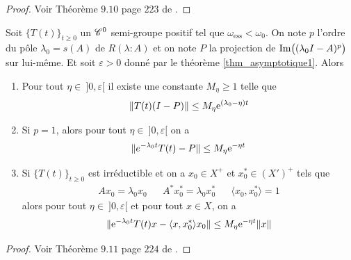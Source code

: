 \begin{proof}
    Voir Théorème $9.10$ page $223$ de \cite{Clement1987}.
\end{proof}

\begin{theorem}\label{thm_asymptotique2}
    Soit $\big\{T(t)\big\}_{t \geq 0}$ un $\mathscr{C}^0$ semi-groupe positif tel que $\omega_{\text{ess}} < \omega_0$. On note $p$ l'ordre du pôle $\lambda_0=s(A)$ de $R(\lambda : A)$ et on note $P$ la projection de $\mathrm{Im}\big((\lambda_0I-A)^p\big)$ sur lui-même. Et soit $\varepsilon >0$ donné par le théorème \ref{thm_asymptotique1}. Alors 
    \begin{enumerate}
        \item Pour tout $\eta \in \ ]0,\varepsilon[$ il existe une constante $M_\eta\geq 1$ telle que 
        \begin{equation*}
            \|T(t)(I-P)\| \leq M_\eta \mathrm{e}^{(\lambda_0-\eta)t}
        \end{equation*}
        \item Si $p=1$, alors pour tout $\eta \in \ ]0,\varepsilon[$ on a 
        \begin{equation*}
            \|e^{-\lambda_0t}T(t)-P\| \leq M_\eta \mathrm{e}^{-\eta t}
        \end{equation*}
        \item Si $\big\{T(t)\big\}_{t \geq 0}$ est irréductible et on a $x_0 \in X^+$ et $x_0^* \in (X')^+$ tels que 
        \begin{equation*}
            \begin{array}{ccccc}
                Ax_0 = \lambda_0x_0 && A^*x_0^* = \lambda_0x_0^* && \langle x_0,x_0^*\rangle =1
            \end{array}
        \end{equation*}
        alors pour tout $\eta \in \ ]0,\varepsilon[$ et pour tout $x \in X$, on a 
        \begin{equation*}
            \|\mathrm{e}^{-\lambda_0t}T(t)x - \langle x,x_0^*\rangle x_0\| \leq M_\eta \mathrm{e}^{-\eta t}\|x\|
        \end{equation*}
    \end{enumerate}
\end{theorem}

\begin{proof}
    Voir Théorème $9.11$ page $224$ de \cite{Clement1987}.
\end{proof}

